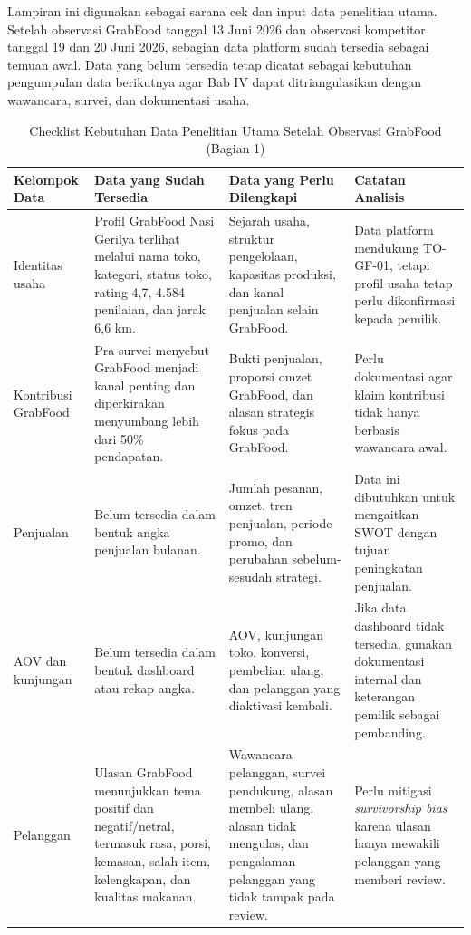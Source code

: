 \label{app:cek-data-penelitian-utama}

Lampiran ini digunakan sebagai sarana cek dan input data penelitian utama. Setelah observasi GrabFood tanggal 13 Juni 2026 dan observasi kompetitor tanggal 19 dan 20 Juni 2026, sebagian data platform sudah tersedia sebagai temuan awal. Data yang belum tersedia tetap dicatat sebagai kebutuhan pengumpulan data berikutnya agar Bab IV dapat ditriangulasikan dengan wawancara, survei, dan dokumentasi usaha.

\begin{table}[!htbp]
    \centering
    \caption{Checklist Kebutuhan Data Penelitian Utama Setelah Observasi GrabFood (Bagian 1)}
    \label{tab:checklist-kebutuhan-data-utama}
    \footnotesize
    \setlength{\tabcolsep}{3pt}
    \renewcommand{\arraystretch}{0.95}
    \begin{tabularx}{\textwidth}{|Z{2.5cm}|Y|Y|Y|}
        \toprule
        \textbf{Kelompok Data} & \textbf{Data yang Sudah Tersedia} & \textbf{Data yang Perlu Dilengkapi} & \textbf{Catatan Analisis} \\ \hline
        \midrule
        Identitas usaha & Profil GrabFood Nasi Gerilya terlihat melalui nama toko, kategori, status toko, rating 4,7, 4.584 penilaian, dan jarak 6,6 km. & Sejarah usaha, struktur pengelolaan, kapasitas produksi, dan kanal penjualan selain GrabFood. & Data platform mendukung TO-GF-01, tetapi profil usaha tetap perlu dikonfirmasi kepada pemilik. \\ \hline
        Kontribusi GrabFood & Pra-survei menyebut GrabFood menjadi kanal penting dan diperkirakan menyumbang lebih dari 50\% pendapatan. & Bukti penjualan, proporsi omzet GrabFood, dan alasan strategis fokus pada GrabFood. & Perlu dokumentasi agar klaim kontribusi tidak hanya berbasis wawancara awal. \\ \hline
        Penjualan & Belum tersedia dalam bentuk angka penjualan bulanan. & Jumlah pesanan, omzet, tren penjualan, periode promo, dan perubahan sebelum-sesudah strategi. & Data ini dibutuhkan untuk mengaitkan SWOT dengan tujuan peningkatan penjualan. \\ \hline
        AOV dan kunjungan & Belum tersedia dalam bentuk dashboard atau rekap angka. & AOV, kunjungan toko, konversi, pembelian ulang, dan pelanggan yang diaktivasi kembali. & Jika data dashboard tidak tersedia, gunakan dokumentasi internal dan keterangan pemilik sebagai pembanding. \\ \hline
        Pelanggan & Ulasan GrabFood menunjukkan tema positif dan negatif/netral, termasuk rasa, porsi, kemasan, salah item, kelengkapan, dan kualitas makanan. & Wawancara pelanggan, survei pendukung, alasan membeli ulang, alasan tidak mengulas, dan pengalaman pelanggan yang tidak tampak pada review. & Perlu mitigasi \textit{survivorship bias} karena ulasan hanya mewakili pelanggan yang memberi review. \\ \hline
        \bottomrule
    \end{tabularx}
\end{table}

